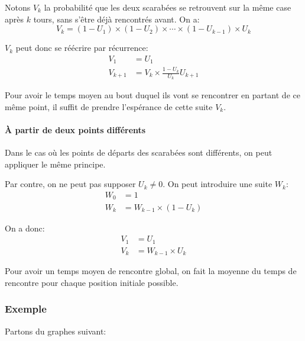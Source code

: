       Notons $V_k$ la probabilité que les deux scarabées se retrouvent sur la
      même case après $k$ tours, sans s'être déjà rencontrés avant. On a:
        \[V_k = (1 - U_1) \times (1 - U_2) \times \cdots \times (1 - U_{k - 1})
        \times U_k\]

      $V_k$ peut donc se réécrire par récurrence:
        \begin{align*}
          V_1       &= U_1 \\
          V_{k + 1} &= V_k \times \frac{1 - U_k}{U_k}U_{k + 1}
        \end{align*}

      Pour avoir le temps moyen au bout duquel ils vont se rencontrer en
      partant de ce même point, il suffit de prendre l'espérance de cette suite
      $V_k$. %

    \paragraph{À partir de deux points différents}
      Dans le cas où les points de départs des scarabées sont différents, on peut
      appliquer le même principe.

      Par contre, on ne peut pas supposer $U_k \neq 0$.
      On peut introduire une suite $W_k$:
      \begin{align*}
        W_0 &= 1 \\
        W_k &= W_{k-1} \times (1 - U_k)
      \end{align*}

      On a donc:
      \begin{align*}
        V_1  &= U_1 \\
        V_k &= W_{k-1} \times U_k
      \end{align*}

      Pour avoir un temps moyen de rencontre global, on fait la moyenne du temps
      de rencontre pour chaque position initiale possible. %

  \subsubsection{Exemple}
    Partons du graphes suivant:
    \begin{center}
    \end{center}

